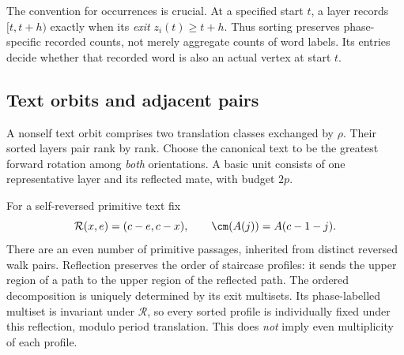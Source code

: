The convention for occurrences is crucial. At a specified start $t$,
a layer records $[t,t+h)$ exactly when its \emph{exit}
$z_i(t)\ge t+h$. Thus sorting preserves phase-specific recorded counts,
not merely aggregate counts of word labels. Its entries decide whether
that recorded word is also an actual vertex at start $t$.

\subsection{Text orbits and adjacent pairs}\label{sec:axes}
A nonself text orbit comprises two translation classes exchanged by
$\rho$. Their sorted layers pair rank by rank. Choose the canonical
text to be the greatest forward rotation among \emph{both} orientations.
A basic unit consists of one representative layer and its reflected
mate, with budget $2p$.

For a self-reversed primitive text fix
\begin{equation}\label{eq:reflection}
\mathcal R(x,e)=(c-e,c-x),\qquad
\cm(A(j))=A(c-1-j).
\end{equation}
There are an even number of primitive passages, inherited from distinct
reversed walk pairs. Reflection preserves the order of staircase
profiles: it sends the upper region of a path to the upper region of
the reflected path. The ordered decomposition is uniquely determined
by its exit multisets. Its phase-labelled multiset is invariant under
$\mathcal R$, so every sorted profile is individually fixed under this
reflection, modulo period translation. This does \emph{not} imply even
multiplicity of each profile.

